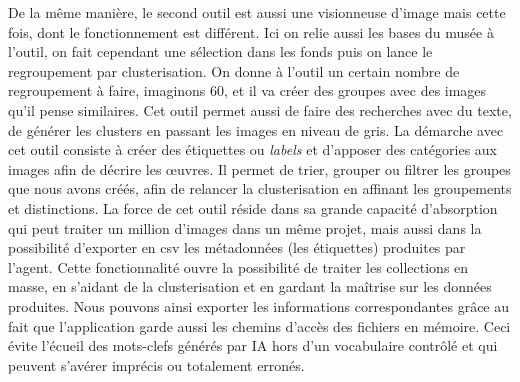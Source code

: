 De la même manière, le second outil est aussi une visionneuse d'image mais cette fois, dont le fonctionnement est différent. Ici on relie aussi les bases du musée à l'outil, on fait cependant une sélection dans les fonds puis on lance le regroupement par clusterisation. On donne à l'outil un certain nombre de regroupement à faire, imaginons 60, et il va créer des groupes avec des images qu'il pense similaires. Cet outil permet aussi de faire des recherches avec du texte, de générer les clusters en passant les images en niveau de gris. La démarche avec cet outil consiste à créer des étiquettes ou \textit{labels} et d'apposer des catégories aux images afin de décrire les œuvres. Il permet de trier, grouper ou filtrer les groupes que nous avons créés, afin de relancer la clusterisation en affinant les groupements et distinctions. La force de cet outil réside dans sa grande capacité d'absorption qui peut traiter un million d'images dans un même projet, mais aussi dans la possibilité d'exporter en csv les métadonnées (les étiquettes) produites par l'agent. Cette fonctionnalité ouvre la possibilité de traiter les collections en masse, en s'aidant de la clusterisation et en gardant la maîtrise sur les données produites. Nous pouvons ainsi exporter les informations correspondantes grâce au fait que l'application garde aussi les chemins d'accès des fichiers en mémoire. Ceci évite l'écueil des mots-clefs générés par IA hors d'un vocabulaire contrôlé et qui peuvent s'avérer imprécis ou totalement erronés.


